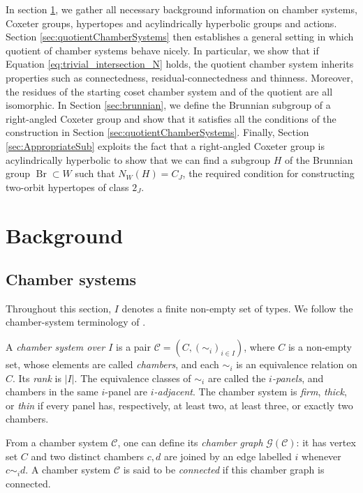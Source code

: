 \documentclass[10pt,a4paper]{amsart}
\newcommand{\GG}{\mathcal{G}}
\newcommand{\CC}{\mathcal{C}}
\newcommand{\C}{\mathcal{C}}
\newcommand{\Br}{\operatorname{Br}}
\begin{document}
In section \ref{sec:background}, we gather all necessary background information on chamber systems, Coxeter groups, hypertopes and acylindrically hyperbolic groups and actions. Section \ref{sec:quotientChamberSystems} then establishes a general setting in which quotient of chamber systems behave nicely. In particular, we show that if Equation \eqref{eq:trivial_intersection_N} holds, the quotient chamber system inherits properties such as connectedness, residual-connectedness and thinness. Moreover, the residues of the starting coset chamber system and of the quotient are all isomorphic. In Section \ref{sec:brunnian}, we define the Brunnian subgroup of a right-angled Coxeter group and show that it satisfies all the conditions of the construction in Section \ref{sec:quotientChamberSystems}. Finally, Section \ref{sec:AppropriateSub} exploits the fact that a right-angled Coxeter group is acylindrically hyperbolic to show that we can find a subgroup $H$ of the Brunnian group $\Br \subset W$ such that $N_W(H) = C_J$, the required condition for constructing two-orbit hypertopes of class $2_J$.

\section{Background}\label{sec:background}

\subsection{Chamber systems}\label{sec:ChamberSystems}

Throughout this section, $I$ denotes a finite non-empty set of types.  We
follow the chamber-system terminology of
\cite[Chapter~3]{buekenhout2013diagram}.


A \emph{chamber system over $I$} is a pair $\CC=(C,(\sim_i)_{i\in I})$,
where $C$ is a non-empty set, whose elements are called \emph{chambers}, and
each $\sim_i$ is an equivalence relation on $C$.  Its \emph{rank} is $|I|$.
The equivalence classes of $\sim_i$ are called the \emph{$i$-panels}, and
chambers in the same $i$-panel are \emph{$i$-adjacent}.  The chamber system
is \emph{firm}, \emph{thick}, or \emph{thin} if every panel has, respectively,
at least two, at least three, or exactly two chambers.

From a chamber system $\C$, one can define its \emph{chamber graph} $\GG(\CC)$: it has vertex set $C$ and two distinct chambers
$c,d$ are joined by an edge labelled $i$ whenever $c\sim_i d$.  A chamber
system $\C$ is said to be \emph{connected} if this chamber graph is connected.
\end{document}
